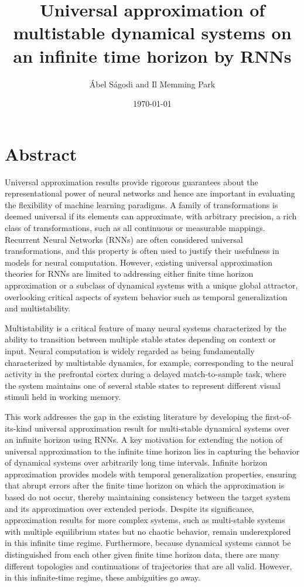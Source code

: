 \documentclass{article}
\title{Universal approximation of multistable dynamical systems on an infinite time horizon by RNNs}
\author{\'Abel S\'agodi and Il Memming Park}
\date{\today}
\theoremstyle{definition}
\theoremstyle{remark}
\newcounter{ct}
\begin{document}
\maketitle

\section*{Abstract}
Universal approximation results provide rigorous guarantees about the representational power of neural networks and hence are important in evaluating the flexibility of machine learning paradigms. A family of transformations is deemed universal if its elements can approximate, with arbitrary precision, a rich class of transformations, such as all continuous or measurable mappings. Recurrent Neural Networks (RNNs) are often considered universal transformations, and this property is often used to justify their usefulness in models for neural computation. However, existing universal approximation theories for RNNs are limited to addressing either finite time horizon approximation or a subclass of dynamical systems with a unique global attractor, overlooking critical aspects of system behavior such as temporal generalization and multistability.

Multistability is a critical feature of many neural systems characterized by the ability to transition between multiple stable states depending on context or input. Neural computation is widely regarded as being fundamentally characterized by multistable dynamics, for example, corresponding to the neural activity in the prefrontal cortex during a delayed match-to-sample task, where the system maintains one of several stable states to represent different visual stimuli held in working memory. 

This work addresses the gap in the existing literature by developing the first-of-its-kind universal approximation result for multi-stable dynamical systems over an infinite horizon using RNNs. A key motivation for extending the notion of universal approximation to the infinite time horizon lies in capturing the behavior of dynamical systems over arbitrarily long time intervals. Infinite horizon approximation provides models with temporal generalization properties, ensuring that abrupt errors after the finite time horizon on which the approximation is based do not occur, thereby maintaining consistency between the target system and its approximation over extended periods. Despite its significance, approximation results for more complex systems, such as multi-stable systems with multiple equilibrium states but no chaotic behavior, remain underexplored in this infinite time regime. Furthermore, because dynamical systems cannot be distinguished from each other given finite time horizon data, there are many different topologies and continuations of trajectories that are all valid. However, in this infinite-time regime, these ambiguities go away.
\end{document}
